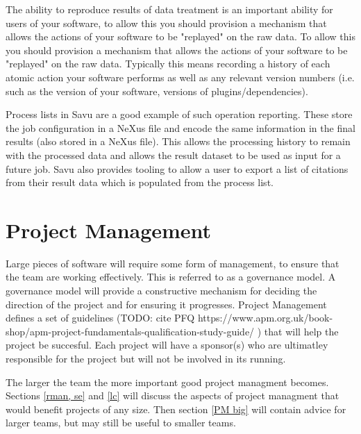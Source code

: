 \documentclass[jnr]{iosart2x}
\begin{document}
The ability to reproduce results of data treatment is an important ability for users of your software, to allow this you should provision a mechanism that allows the actions of your software to be "replayed" on the raw data.
To allow this you should provision a mechanism that allows the actions of your software to be "replayed" on the raw data.
Typically this means recording a history of each atomic action your software performs as well as any relevant version numbers (i.e. such as the version of your software, versions of plugins/dependencies).

Process lists in Savu \cite{Wadeson_2016} are a good example of such operation reporting.
These store the job configuration in a NeXus file and encode the same information in the final results (also stored in a NeXus file).
This allows the processing history to remain with the processed data and allows the result dataset to be used as input for a future job.
Savu also provides tooling to allow a user to export a list of citations from their result data which is populated from the process list.

\section{Project Management}
\label{Project Management}

Large pieces of software will require some form of management, to ensure that the team are working effectively.
This is referred to as a governance model.
A governance model will provide a constructive mechanism for deciding the direction of the project and for ensuring it progresses.
Project Management defines a set of guidelines (TODO: cite PFQ https://www.apm.org.uk/book-shop/apm-project-fundamentals-qualification-study-guide/ ) that will help the project be succesful.
Each project will have a sponsor(s) who are ultimatley responsible for the project but will not be involved in its running.

The larger the team the more important good project managment becomes.
Sections \ref{rman, se} and \ref{lc} will discuss the aspects of project managment that would benefit projects of any size.
Then section \ref{PM big} will contain advice for larger teams, but may still be useful to smaller teams.
\end{document}
